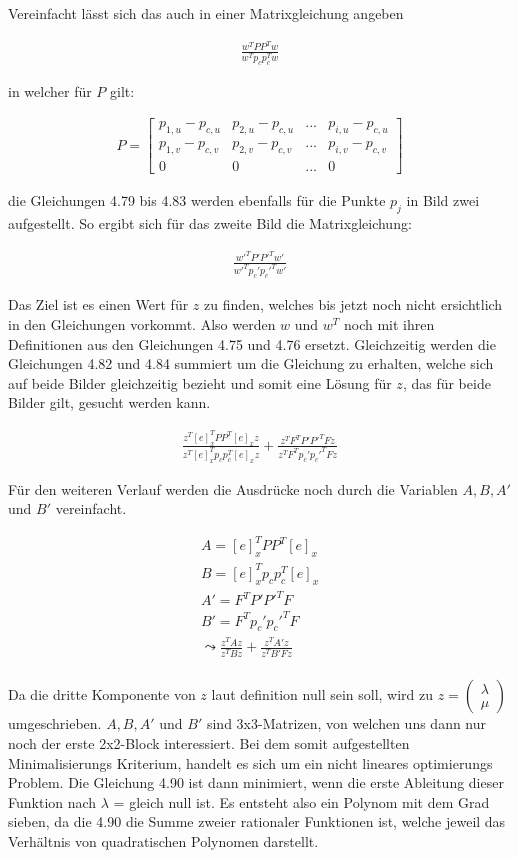 Vereinfacht lässt sich das auch in einer Matrixgleichung angeben

\begin{gather}
	\frac{w^TPP^Tw}{w^Tp_cp_c^Tw}
\end{gather}

in welcher für $P$ gilt:

\begin{gather}
	P=\begin{bmatrix}
	p_{1,u}-p_{c,u}&p_{2,u}-p_{c,u}&...&p_{i,u}-p_{c,u}\\
	p_{1,v}-p_{c,v}&p_{2,v}-p_{c,v}&...&p_{i,v}-p_{c,v}\\
	0&0&...&0	
	\end{bmatrix}
\end{gather}

die Gleichungen 4.79 bis 4.83 werden ebenfalls für die Punkte $p_j$ in Bild zwei aufgestellt. So ergibt sich für das zweite Bild die Matrixgleichung:

\begin{gather}
	\frac{w'^TP'P'^Tw'}{w'^Tp_c'p_c'^Tw'}
\end{gather} 

Das Ziel ist es einen Wert für $z$ zu finden, welches bis jetzt noch nicht ersichtlich in den Gleichungen vorkommt. Also werden $w$ und $w^T$ noch mit ihren Definitionen aus den Gleichungen 4.75 und 4.76 ersetzt. Gleichzeitig werden die Gleichungen 4.82 und 4.84 summiert um die Gleichung zu erhalten, welche sich auf beide Bilder gleichzeitig bezieht und somit eine Lösung für $z$, das für beide Bilder gilt, gesucht werden kann.

\begin{gather}
	\frac{z^T[e]_x^TPP^T[e]_xz}{z^T[e]_x^Tp_cp_c^T[e]_xz}+\frac{z^TF^TP'P'^TFz}{z^TF^Tp_c'p_c'^TFz}
\end{gather}

Für den weiteren Verlauf werden die Ausdrücke noch durch die Variablen $A,B,A'$ und $B'$ vereinfacht.

\begin{gather}
	A = [e]_x^TPP^T[e]_x\\
	B=[e]_x^Tp_cp_c^T[e]_x\\
	A'=F^TP'P'^TF\\
	B'= F^Tp_c'p_c'^TF\\
	\leadsto 
	\frac{z^TAz}{z^TBz}+\frac{z^TA'z}{z^TB'Fz}
\end{gather}\\

Da die dritte Komponente von $z$ laut definition null sein soll, wird zu $z = \begin{pmatrix}
\lambda\\ \mu\end{pmatrix}$ umgeschrieben. $A,B,A'$ und $B'$ sind 3x3-Matrizen, von welchen uns dann nur noch der erste 2x2-Block interessiert. Bei dem somit aufgestellten Minimalisierungs Kriterium, handelt es sich um ein nicht lineares optimierungs Problem. Die Gleichung 4.90 ist dann minimiert, wenn die erste Ableitung dieser Funktion nach $\lambda$ = gleich null ist. Es entsteht also ein Polynom mit dem Grad sieben, da die 4.90 die Summe zweier rationaler Funktionen ist, welche jeweil das Verhältnis von quadratischen Polynomen darstellt.

